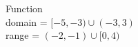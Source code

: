 {\noindent\begin{minipage}{\linewidth}\centering
{}
\end{minipage}}
{Function \\ domain = $[-5,-3) \cup(-3, 3)$ \\ range = $(-2, -1) \cup [0, 4)$}